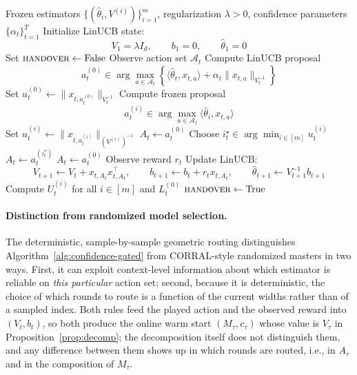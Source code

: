 \documentclass{article}
\theoremstyle{definition}
\theoremstyle{remark}
\theoremstyle{remark}
\begin{document}
\begin{algorithm}[t]
\caption{Confidence-Gated Master over Frozen Policies and LinUCB}
\label{alg:confidence-gated}
\begin{algorithmic}[1]
\Require Frozen estimators $\{(\widehat{\theta}_i,V^{(i)})\}_{i=1}^m$, regularization $\lambda>0$, confidence parameters $\{\alpha_t\}_{t=1}^T$
\State Initialize LinUCB state:
\[
V_1=\lambda I_d,\qquad b_1=0,\qquad \widehat{\theta}_1=0
\]
\State Set $\textsc{handover}\gets \mathrm{False}$
    \State Observe action set $\mathcal{A}_t$
    \State Compute LinUCB proposal
    \[
    a_t^{(0)} \in \arg\max_{a\in\mathcal{A}_t}
    \left\{
    \langle \widehat{\theta}_t,x_{t,a}\rangle
    + \alpha_t \|x_{t,a}\|_{V_t^{-1}}
    \right\}
    \]
    \State Set $u_t^{(0)} \gets \|x_{t,a_t^{(0)}}\|_{V_t^{-1}}$
        \State Compute frozen proposal
        \[
        a_t^{(i)} \in \arg\max_{a\in\mathcal{A}_t}
        \langle \widehat{\theta}_i,x_{t,a}\rangle
        \]
        \State Set $u_t^{(i)} \gets \|x_{t,a_t^{(i)}}\|_{(V^{(i)})^{-1}}$
    \EndFor
        \State $A_t \gets a_t^{(0)}$
    \Else
        \State Choose $i_t^\star \in \arg\min_{i\in[m]} u_t^{(i)}$
            \State $A_t \gets a_t^{(i_t^\star)}$
        \Else
            \State $A_t \gets a_t^{(0)}$
        \EndIf
    \EndIf
    \State Observe reward $r_t$
    \State Update LinUCB:
    \[
    V_{t+1}\gets V_t + x_{t,A_t}x_{t,A_t}^\top,
    \qquad
    b_{t+1}\gets b_t + r_t x_{t,A_t},
    \qquad
    \widehat{\theta}_{t+1}\gets V_{t+1}^{-1}b_{t+1}
    \]
    \State Compute $U_t^{(i)}$ for all $i\in[m]$ and $L_t^{(0)}$
        \State $\textsc{handover}\gets \mathrm{True}$
    \EndIf
\EndFor
\end{algorithmic}
\end{algorithm}

\paragraph{Distinction from randomized model selection.}
The deterministic, sample-by-sample geometric routing distinguishes
Algorithm~\ref{alg:confidence-gated} from CORRAL-style randomized
masters in two ways. First, it can exploit context-level information
about which estimator is reliable on \emph{this particular} action
set; second, because it is deterministic, the choice of which rounds to route
is a function of the current widths rather than of a sampled index. Both
rules feed the played action and the observed reward into $(V_t,b_t)$, so
both produce the online warm start $(M_\tau,c_\tau)$ whose value is
$V_\tau$ in Proposition~\ref{prop:decomp}; the decomposition itself does not
distinguish them, and any difference between them shows up in which rounds
are routed, i.e., in $A_\tau$ and in the composition of $M_\tau$.
\end{document}
